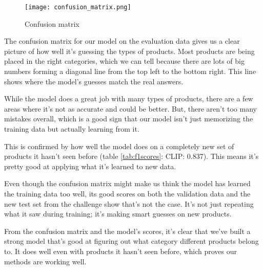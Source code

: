 \begin{figure}[H]
	\centering
	\texttt{[image: confusion\_matrix.png]}
	\caption{Confusion matrix}
	\label{fig:confusionmatrix}
\end{figure}

The confusion matrix for our model on the evaluation data gives us a clear picture of how well it's guessing the types of products. Most products are being placed in the right categories, which we can tell because there are lots of big numbers forming a diagonal line from the top left to the bottom right. This line shows where the model's guesses match the real answers.

While the model does a great job with many types of products, there are a few areas where it's not as accurate and could be better. But, there aren't too many mistakes overall, which is a good sign that our model isn't just memorizing the training data but actually learning from it.

This is confirmed by how well the model does on a completely new set of products it hasn't seen before (table \ref*{tab:f1scores}: CLIP: 0.837). This means it's pretty good at applying what it's learned to new data.

Even though the confusion matrix might make us think the model has learned the training data too well, its good scores on both the validation data and the new test set from the challenge show that's not the case. It's not just repeating what it saw during training; it's making smart guesses on new products.

From the confusion matrix and the model's scores, it's clear that we've built a strong model that's good at figuring out what category different products belong to. It does well even with products it hasn't seen before, which proves our methods are working well.